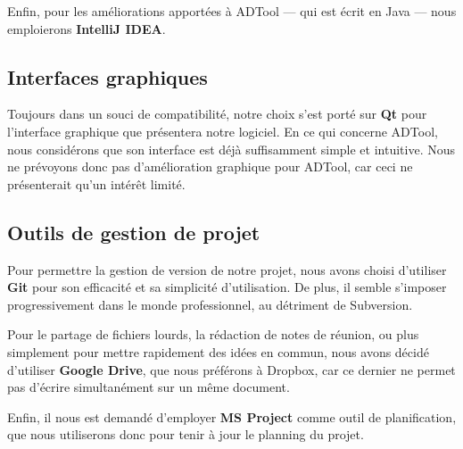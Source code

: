         Enfin, pour les améliorations apportées à ADTool --- qui est écrit en Java --- nous emploierons {\bf IntelliJ IDEA}.

    \subsection{Interfaces graphiques}
        Toujours dans un souci de compatibilité, notre choix s'est porté sur {\bf Qt} pour l'interface graphique que présentera notre logiciel. En ce qui concerne ADTool, nous considérons que son interface est déjà suffisamment simple et intuitive. Nous ne prévoyons donc pas d'amélioration graphique pour ADTool, car ceci ne présenterait qu'un intérêt limité.

	\subsection{Outils de gestion de projet}
        Pour permettre la gestion de version de notre projet, nous avons choisi d'utiliser {\bf Git} pour son efficacité et sa simplicité d'utilisation. De plus, il semble s'imposer progressivement dans le monde professionnel, au détriment de Subversion.
        
        Pour le partage de fichiers lourds, la rédaction de notes de réunion, ou plus simplement pour mettre rapidement des idées en commun, nous avons décidé d'utiliser {\bf Google Drive}, que nous préférons à Dropbox, car ce dernier ne permet pas d'écrire simultanément sur un même document.

        Enfin, il nous est demandé d'employer {\bf MS Project} comme outil de planification, que nous utiliserons donc pour tenir à jour le planning du projet.